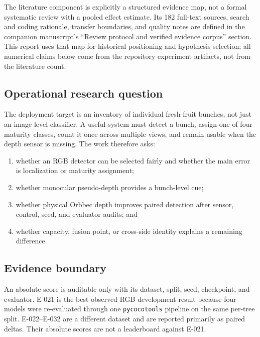 \documentclass[preprint,12pt]{elsarticle}
\begin{document}
The literature component is explicitly a structured evidence map, not a formal
systematic review with a pooled effect estimate. Its 182 full-text sources,
search and coding rationale, transfer boundaries, and quality notes are defined
in the companion manuscript's ``Review protocol and verified evidence corpus''
section. This report uses that map for historical positioning and hypothesis
selection; all numerical claims below come from the repository experiment
artifacts, not from the literature count.

\subsection{Operational research question}
The deployment target is an inventory of individual fresh-fruit bunches, not
just an image-level classifier. A useful system must detect a bunch, assign
one of four maturity classes, count it once across multiple views, and remain
usable when the depth sensor is missing. The work therefore asks:
\begin{enumerate}
\item whether an RGB detector can be selected fairly and whether the main
      error is localization or maturity assignment;
\item whether monocular pseudo-depth provides a bunch-level cue;
\item whether physical Orbbec depth improves paired detection after sensor,
      control, seed, and evaluator audits; and
\item whether capacity, fusion point, or cross-side identity explains a
      remaining difference.
\end{enumerate}

\subsection{Evidence boundary}
An absolute score is auditable only with its dataset, split, seed, checkpoint,
and evaluator. E-021 is the best observed RGB development result because four models were
re-evaluated through one \texttt{pycocotools} pipeline on the same per-tree
split. E-022--E-032 are a different dataset and are reported primarily as
paired deltas. Their absolute scores are not a leaderboard against E-021.
\end{document}

